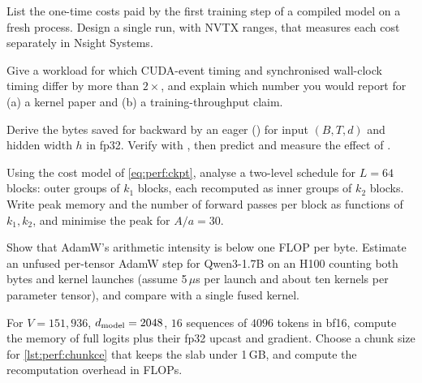 \begin{exercise}
List the one-time costs paid by the first training step of a compiled model on a fresh process.
Design a single run, with NVTX ranges, that measures each cost separately in Nsight Systems.
\end{exercise}

\begin{exercise}
Give a workload for which CUDA-event timing and synchronised wall-clock timing differ by more than
$2\times$, and explain which number you would report for (a) a kernel paper and (b) a training-throughput
claim.
\end{exercise}

\begin{exercise}
Derive the bytes saved for backward by an eager  () for
input $(B,T,d)$ and hidden width $h$ in fp32. Verify with , then predict
and measure the effect of .
\end{exercise}

\begin{exercise}\label{ex:perf:twolevel}
Using the cost model of \cref{eq:perf:ckpt}, analyse a two-level schedule for $L=64$ blocks: outer
groups of $k_1$ blocks, each recomputed as inner groups of $k_2$ blocks. Write peak memory and the
number of forward passes per block as functions of $k_1,k_2$, and minimise the peak for $A/a=30$.
\end{exercise}

\begin{exercise}
Show that AdamW's arithmetic intensity is below one FLOP per byte. Estimate an unfused per-tensor
AdamW step for Qwen3-1.7B on an H100 counting both bytes and kernel launches (assume 5\,$\mu$s per
launch and about ten kernels per parameter tensor), and compare with a single fused kernel.
\end{exercise}

\begin{exercise}
For $V=151{,}936$, $d_{\text{model}}=2048$, $16$ sequences of $4096$ tokens in bf16, compute the memory of
full logits plus their fp32 upcast and gradient. Choose a chunk size for \cref{lst:perf:chunkce}
that keeps the slab under 1\,GB, and compute the recomputation overhead in FLOPs.
\end{exercise}

